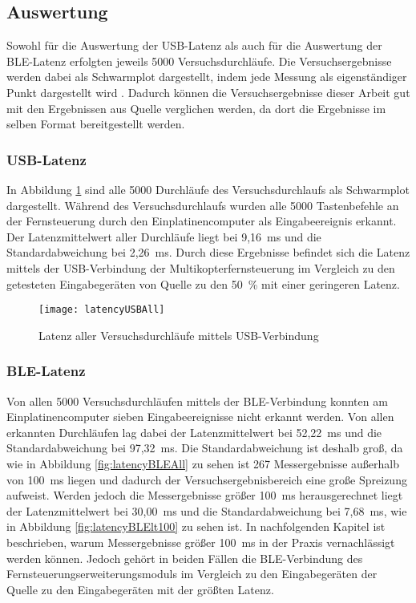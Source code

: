 \subsection{Auswertung}
Sowohl für die Auswertung der USB-Latenz als auch für die Auswertung der \ac{BLE}-Latenz erfolgten jeweils 5000 Versuchsdurchläufe. Die Versuchsergebnisse werden dabei als Schwarmplot dargestellt, indem jede Messung als eigenständiger Punkt dargestellt wird \cite[S.~7]{wimmerLatenzStation}. Dadurch können die Versuchsergebnisse dieser Arbeit gut mit den Ergebnissen aus Quelle \cite{wimmerLatenzStation} verglichen werden, da dort die Ergebnisse im selben Format bereitgestellt werden. 

\subsubsection{USB-Latenz}
In Abbildung \ref{fig:latencyUSBAll} sind alle 5000 Durchläufe des Versuchsdurchlaufs als Schwarmplot dargestellt. Während des Versuchsdurchlaufs wurden alle 5000 Tastenbefehle an der Fernsteuerung durch den Einplatinencomputer als Eingabeereignis erkannt. Der Latenzmittelwert aller Durchläufe liegt bei 9,16~ms und die Standardabweichung bei 2,26~ms. Durch diese Ergebnisse befindet sich die Latenz mittels der USB-Verbindung der Multikopterfernsteuerung im Vergleich zu den getesteten Eingabegeräten von Quelle \cite{wimmerLatenzStation} zu den 50~\% mit einer geringeren Latenz.

\begin{figure}[H]
    \centering
    \texttt{[image: latencyUSBAll]}
    \caption{Latenz aller Versuchsdurchläufe mittels USB-Verbindung}
    \label{fig:latencyUSBAll}
\end{figure}

\subsubsection{\ac{BLE}-Latenz}
Von allen 5000 Versuchsdurchläufen mittels der \ac{BLE}-Verbindung konnten am Einplatinencomputer sieben Eingabeereignisse nicht erkannt werden. Von allen erkannten Durchläufen lag dabei der Latenzmittelwert bei 52,22~ms und die Standardabweichung bei 97,32~ms. Die Standardabweichung ist deshalb groß, da wie in Abbildung \ref{fig:latencyBLEAll} zu sehen ist 267 Messergebnisse außerhalb von 100~ms liegen und dadurch der Versuchsergebnisbereich eine große Spreizung aufweist. Werden jedoch die Messergebnisse größer 100~ms herausgerechnet liegt der Latenzmittelwert bei 30,00~ms und die Standardabweichung bei 7,68~ms, wie in Abbildung \ref{fig:latencyBLElt100} zu sehen ist. In nachfolgenden Kapitel ist beschrieben, warum Messergebnisse größer 100~ms in der Praxis vernachlässigt werden können. Jedoch gehört in beiden Fällen die \ac{BLE}-Verbindung des Fernsteuerungserweiterungsmoduls im Vergleich zu den Eingabegeräten der Quelle \cite{wimmerLatenzStation} zu den Eingabegeräten mit der größten Latenz.

